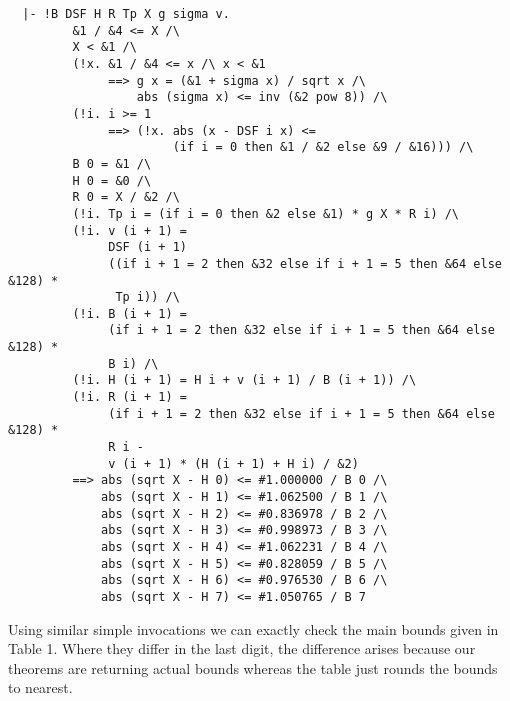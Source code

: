 \documentclass[10pt]{article}
\theoremstyle{definition}
\theoremstyle{remark}
\numberwithin{equation}{section}
\begin{document}
\begin{scriptsize}\begin{verbatim}
  |- !B DSF H R Tp X g sigma v.
         &1 / &4 <= X /\
         X < &1 /\
         (!x. &1 / &4 <= x /\ x < &1
              ==> g x = (&1 + sigma x) / sqrt x /\
                  abs (sigma x) <= inv (&2 pow 8)) /\
         (!i. i >= 1
              ==> (!x. abs (x - DSF i x) <=
                       (if i = 0 then &1 / &2 else &9 / &16))) /\
         B 0 = &1 /\
         H 0 = &0 /\
         R 0 = X / &2 /\
         (!i. Tp i = (if i = 0 then &2 else &1) * g X * R i) /\
         (!i. v (i + 1) =
              DSF (i + 1)
              ((if i + 1 = 2 then &32 else if i + 1 = 5 then &64 else &128) *
               Tp i)) /\
         (!i. B (i + 1) =
              (if i + 1 = 2 then &32 else if i + 1 = 5 then &64 else &128) *
              B i) /\
         (!i. H (i + 1) = H i + v (i + 1) / B (i + 1)) /\
         (!i. R (i + 1) =
              (if i + 1 = 2 then &32 else if i + 1 = 5 then &64 else &128) *
              R i -
              v (i + 1) * (H (i + 1) + H i) / &2)
         ==> abs (sqrt X - H 0) <= #1.000000 / B 0 /\
             abs (sqrt X - H 1) <= #1.062500 / B 1 /\
             abs (sqrt X - H 2) <= #0.836978 / B 2 /\
             abs (sqrt X - H 3) <= #0.998973 / B 3 /\
             abs (sqrt X - H 4) <= #1.062231 / B 4 /\
             abs (sqrt X - H 5) <= #0.828059 / B 5 /\
             abs (sqrt X - H 6) <= #0.976530 / B 6 /\
             abs (sqrt X - H 7) <= #1.050765 / B 7
\end{verbatim}\end{scriptsize}

Using similar simple invocations we can exactly check the main bounds given in
Table 1. Where they differ in the last digit, the difference arises because our
theorems are returning actual bounds whereas the table just rounds the bounds
to nearest.
\end{document}
